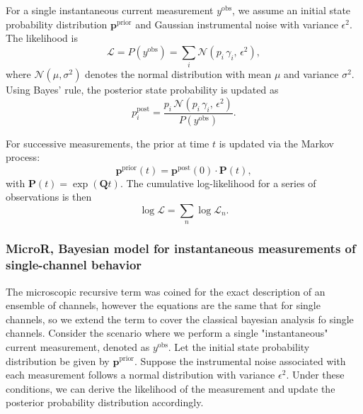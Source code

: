 \documentclass[pdflatex,sn-mathphys-num]{sn-jnl}%
\theoremstyle{thmstyleone}%
\theoremstyle{thmstyletwo}%
\theoremstyle{thmstylethree}%
\begin{document}
For a single instantaneous current measurement \(y^{\text{obs}}\), we assume an initial state probability distribution \(\boldsymbol{p}^{\text{prior}}\) and Gaussian instrumental noise with variance \(\epsilon^2\). The likelihood is
\begin{equation}
	\mathcal{L} = P(y^{\text{obs}}) = \sum_i \mathcal{N}(p_i\,\gamma_i,\,\epsilon^2),
	\label{eq:single_channel_likelihood_short}
\end{equation}
where \(\mathcal{N}(\mu,\sigma^2)\) denotes the normal distribution with mean \(\mu\) and variance \(\sigma^2\). Using Bayes' rule, the posterior state probability is updated as
\begin{equation}
	p^{\text{post}}_i = \frac{p_i\,\mathcal{N}(p_i\,\gamma_i,\,\epsilon^2)}{P(y^{\text{obs}})}.
	\label{eq:single_channel_posterior_short}
\end{equation}

For successive measurements, the prior at time \(t\) is updated via the Markov process:
\begin{equation}
	\boldsymbol{p}^{\text{prior}}(t) = \boldsymbol{p}^{\text{post}}(0) \cdot \boldsymbol{P}(t),
	\label{eq:prior_update_short}
\end{equation}
with \(\boldsymbol{P}(t)=\exp(\boldsymbol{Q}t)\). The cumulative log-likelihood for a series of observations is then
\begin{equation}
	\log \mathcal{L} = \sum_n \log \mathcal{L}_n.
	\label{eq:total_loglikelihood_short}
\end{equation}


\subsubsection{MicroR, Bayesian model for instantaneous measurements of single-channel behavior}

The microscopic recursive term was coined for the exact description of an ensemble of channels, however the equations are the same that for single channels, so we extend the term to cover the classical bayesian analysis fo single channels. 
Consider the scenario where we perform a single "instantaneous" current measurement, denoted as \( y^{\text{obs}} \). Let the initial state probability distribution be given by \( \boldsymbol{p}^{\text{prior}} \). Suppose the instrumental noise associated with each measurement follows a normal distribution with variance \( \epsilon^2 \). Under these conditions, we can derive the likelihood of the measurement and update the posterior probability distribution accordingly.
\end{document}

